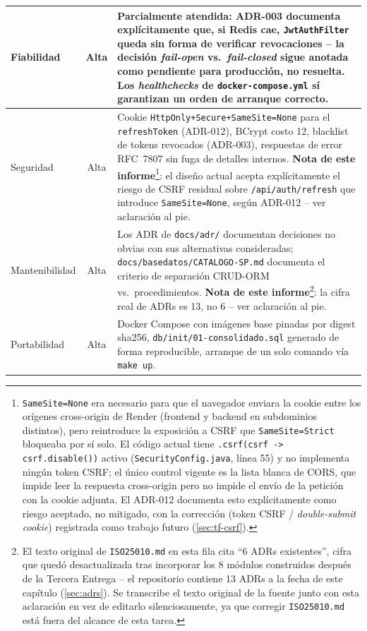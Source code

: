 \begin{center}
\begin{longtable}{|l|c|p{8.7cm}|}
\hline
Fiabilidad & Alta & Parcialmente atendida: ADR-003 documenta explícitamente que, si Redis cae, \texttt{JwtAuthFilter} queda sin forma de verificar revocaciones -- la decisión \emph{fail-open} vs.\ \emph{fail-closed} sigue anotada como pendiente para producción, no resuelta. Los \emph{healthchecks} de \texttt{docker-compose.yml} sí garantizan un orden de arranque correcto. \\
\hline
Seguridad & Alta & Cookie \texttt{HttpOnly+Secure+SameSite=None} para el \texttt{refreshToken} (ADR-012), BCrypt costo 12, blacklist de tokens revocados (ADR-003), respuestas de error RFC~7807 sin fuga de detalles internos. \textbf{Nota de este informe}\footnote{\texttt{SameSite=None} era necesario para que el navegador enviara la cookie entre los orígenes cross-origin de Render (frontend y backend en subdominios distintos), pero reintroduce la exposición a CSRF que \texttt{SameSite=Strict} bloqueaba por sí solo. El código actual tiene \texttt{.csrf(csrf -> csrf.disable())} activo (\texttt{SecurityConfig.java}, línea 55) y no implementa ningún token CSRF; el único control vigente es la lista blanca de CORS, que impide leer la respuesta cross-origin pero no impide el envío de la petición con la cookie adjunta. El ADR-012 documenta esto explícitamente como riesgo aceptado, no mitigado, con la corrección (token CSRF / \emph{double-submit cookie}) registrada como trabajo futuro (\autoref{sec:tf-csrf}).}: el diseño actual acepta explícitamente el riesgo de CSRF residual sobre \texttt{/api/auth/refresh} que introduce \texttt{SameSite=None}, según ADR-012 -- ver aclaración al pie. \\
\hline
Mantenibilidad & Alta & Los ADR de \texttt{docs/adr/} documentan decisiones no obvias con sus alternativas consideradas; \texttt{docs/basedatos/CATALOGO-SP.md} documenta el criterio de separación CRUD-ORM vs.\ procedimientos. \textbf{Nota de este informe}\footnote{El texto original de \texttt{ISO25010.md} en esta fila cita ``6 ADRs existentes'', cifra que quedó desactualizada tras incorporar los 8 módulos construidos después de la Tercera Entrega -- el repositorio contiene 13 ADRs a la fecha de este capítulo (\autoref{sec:adrs}). Se transcribe el texto original de la fuente junto con esta aclaración en vez de editarlo silenciosamente, ya que corregir \texttt{ISO25010.md} está fuera del alcance de esta tarea.}: la cifra real de ADRs es 13, no 6 -- ver aclaración al pie. \\
\hline
Portabilidad & Alta & Docker Compose con imágenes base pinadas por digest sha256, \texttt{db/init/01-consolidado.sql} generado de forma reproducible, arranque de un solo comando vía \texttt{make up}. \\
\hline
\end{longtable}
\end{center}

